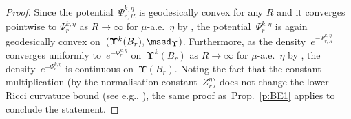 \documentclass[11pt,letterpaper]{amsart}
\newcommand{\purple}[1]{{\color{purple}#1}}
\newcommand{\dUpsilon}{{\mathbf \Upsilon}}
\newcommand{\U}{\dUpsilon}
\newcommand{\E}{\mathcal E}
\renewcommand{\1}{\mathbf 1}
\numberwithin{equation}{section}
\theoremstyle{plain}
\theoremstyle{definition}
\theoremstyle{remark}
\renewcommand{\paragraph}[1]{\medskip\emph{#1}.\quad}
\begin{document}
\begin{proof} 
Since the potential~$\Psi_{r, R}^{k, \eta}$ is geodesically convex for any $R$ and it converges pointwise to $\Psi_{r}^{k, \eta}$ as $R \to \infty$ for $\mu$-a.e.~$\eta$ by \cite[Lem.~2.3 and Proof of Thm.\ 2.1 in~p.~183]{DerHarLebMai20},  the potential~$\Psi_{r}^{k, \eta}$ is again geodesically convex on~$(\U^k(B_r), \mssd_\U)$. Furthermore, as the density~$e^{-\Psi_{r, R}^{k, \eta}}$ converges uniformly to~$e^{-\Psi_{r}^{k, \eta}}$ on~$\U^k(B_r)$ as $R \to \infty$ for $\mu$-a.e.~$\eta$ by \cite[Lem.~2.3 and Proof of Thm.\ 2.1 in~p.~183]{DerHarLebMai20}, the density~$e^{-\Psi_{r}^{k, \eta}}$ is continuous on~$\U(B_r)$. Noting the fact that the constant multiplication (by the normalisation constant~$Z_r^\eta$) does not change the lower Ricci curvature bound (see e.g., \cite[Prop.~4.13]{Stu06a}), the same proof as~Prop.\ \ref{p:BE1} applies to conclude the statement.
%
%

\end{proof}
\end{document}
